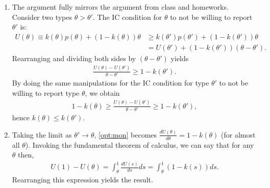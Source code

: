 \documentclass[a4paper]{article}
\begin{document}
	\begin{enumerate}
		\item The argument fully mirrors the argument from class and homeworks. Consider two types $\theta > \theta'$. The IC condition for $\theta$ to not be willing to report $\theta'$ is:
		\begin{align*}
			U(\theta) \equiv k(\theta) p(\theta) + (1-k(\theta)) \theta &\geq k(\theta') p(\theta') + (1-k(\theta')) \theta
			\\
			&= U(\theta') + (1-k(\theta')) (\theta-\theta').
		\end{align*}
		Rearranging and dividing both sides by $(\theta-\theta')$ yields
		\begin{align*}
			\frac{U(\theta)-U(\theta')}{\theta-\theta'} \geq 1-k(\theta').
		\end{align*}
		By doing the same manipulations for the IC condition for type $\theta'$ to not be willing to report type $\theta$, we obtain
		\begin{align}
			\label{opt:mon}
			1-k(\theta) \geq \frac{U(\theta)-U(\theta')}{\theta-\theta'} \geq 1-k(\theta'),
		\end{align}
		hence $k(\theta) \leq k(\theta')$.
		
		\item Taking the limit as $\theta' \to \theta$, \eqref{opt:mon} becomes $\frac{dU(\theta)}{d\theta} = 1-k(\theta)$ (for almost all $\theta$). Invoking the fundamental theorem of calculus, we can say that for any $\theta$ then,
		\begin{align}
			\label{opt:ERP}
			U(1) - U(\theta) = \int_{\theta}^{1} \frac{dU(s)}{ds} ds = \int_{\theta}^{1} (1-k(s)) ds.
		\end{align}
		Rearranging this expression yields the result.
		

\end{enumerate}
\end{document}
